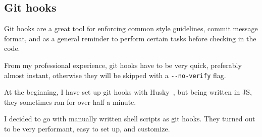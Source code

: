 \subsection{Git hooks}\label{sec:git-hooks}

Git hooks are a great tool
for enforcing common style guidelines,
commit message format,
and as a general reminder
to perform certain tasks before checking in the code.

From my professional experience,
git hooks have to be very quick,
preferably almost instant,
otherwise they will be skipped
with a \texttt{{-}{-}no-verify} flag.

At the beginning,
I have set up git hooks
with Husky~\cite{typicode_husky_2022},
but being written in JS,
they sometimes ran for over half a minute.

I decided to go with manually written shell scripts
as git hooks.
They turned out to be very performant,
easy to set up, and customize.
